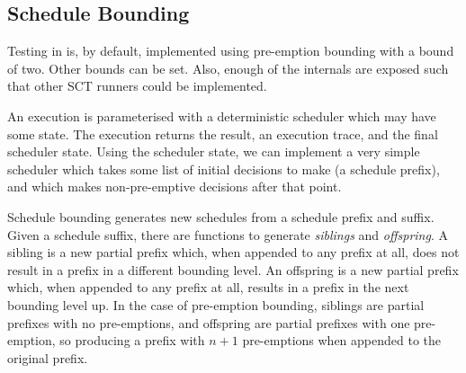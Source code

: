 \subsection*{Schedule Bounding}
\label{sec:dejafu-impl-bound}

Testing in \dejafu{} is, by default, implemented using pre-emption
bounding with a bound of two. Other bounds can be set. Also, enough of
the internals are exposed such that other SCT runners could be
implemented.

An execution is parameterised with a deterministic scheduler which may
have some state. The execution returns the result, an execution trace,
and the final scheduler state. Using the scheduler state, we can
implement a very simple scheduler which takes some list of initial
decisions to make (a schedule prefix), and which makes non-pre-emptive
decisions after that point.

Schedule bounding generates new schedules from a schedule prefix and
suffix. Given a schedule suffix, there are functions to generate
\textit{siblings} and \textit{offspring}. A sibling is a new partial
prefix which, when appended to any prefix at all, does not result in a
prefix in a different bounding level. An offspring is a new partial
prefix which, when appended to any prefix at all, results in a prefix
in the next bounding level up. In the case of pre-emption bounding,
siblings are partial prefixes with no pre-emptions, and offspring are
partial prefixes with one pre-emption, so producing a prefix with
$n+1$ pre-emptions when appended to the original prefix.

